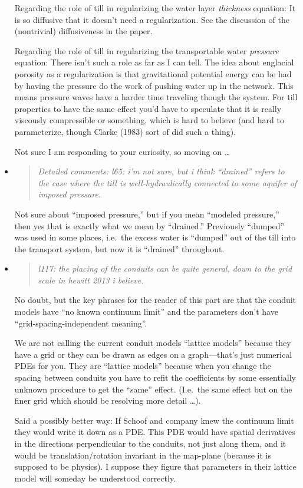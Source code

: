 \documentclass[11pt,reqno]{amsart}
\newcommand{\reply}[2]{
\medskip\medskip
\item  \begin{quote}
\emph{#1}
\end{quote}

\medskip
\noindent #2}
\begin{document}
\begin{itemize}
{\medskip
Regarding the role of till in regularizing the water layer \emph{thickness} equation:  It is so diffusive that it doesn't need a regularization.  See the discussion of the (nontrivial) diffusiveness in the paper.

\medskip
Regarding the role of till in regularizing the transportable water \emph{pressure} equation:  There isn't such a role as far as I can tell.  The idea about englacial porosity as a regularization is that gravitational potential energy can be had by having the pressure do the work of pushing water up in the network.  This means pressure waves have a harder time traveling though the system.  For till properties to have the same effect you'd have to speculate that it is really viscously compressible or something, which is hard to believe (and hard to parameterize, though Clarke (1983) sort of did such a thing).

\medskip
Not sure I am responding to your curiosity, so moving on \dots}

\reply{Detailed comments:
l65: i'm not sure, but i think ``drained'' refers to the case where the till is well-hydraulically connected to some aquifer of imposed pressure.}{Not sure about ``imposed pressure,'' but if you mean ``modeled pressure,'' then yes that is exactly what we mean by ``drained.''  Previously ``dumped'' was used in some places, i.e.~the excess water is ``dumped'' out of the till into the transport system, but now it is ``drained'' throughout.}

\reply{l117: the placing of the conduits can be quite general, down to the grid scale in hewitt 2013 i believe.}{No doubt, but the key phrases for the reader of this part are that the conduit models have ``no known continuum limit'' and the parameters don't have ``grid-spacing-independent meaning''.

\medskip
We are not calling the current conduit models ``lattice models'' because they have a grid or they can be drawn as edges on a graph---that's just numerical PDEs for you.  They are ``lattice models'' because when you change the spacing between conduits you have to refit the coefficients by some essentially unknown procedure to get the ``same'' effect.  (I.e.~the same effect but on the finer grid which should be resolving more detail \dots).

\medskip
Said a possibly better way: If Schoof and company knew the continuum limit they would write it down as a PDE.  This PDE would have spatial derivatives in the directions perpendicular to the conduits, not just along them, and it would be translation/rotation invariant in the map-plane (because it is supposed to be physics).  I suppose they figure that parameters in their lattice model will someday be understood correctly.

}
\end{itemize}
\end{document}
